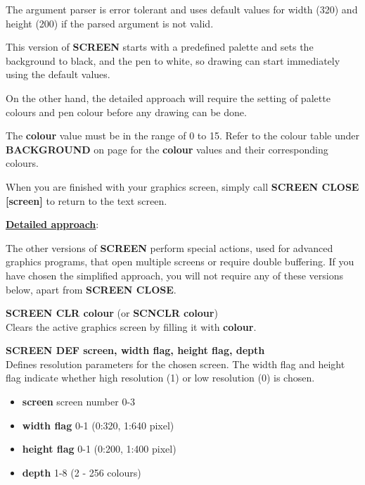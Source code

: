 \begin{description}[leftmargin=2cm,style=nextline]
               The argument parser is error tolerant and uses default values
               for width (320) and height (200)
               if the parsed argument is not valid.

               This version of {\bf SCREEN} starts with a predefined
               palette and sets the background to black, and the pen to white,
               so drawing can start immediately using the default values.

               On the other hand, the detailed approach
               will require the setting of palette colours and pen colour
               before any drawing can be done.

               The {\bf colour} value must be in the range of 0 to 15.
               Refer to the colour table under {\bf BACKGROUND} on page
               \pageref{colourtable} for the {\bf colour} values and their corresponding colours.

               When you are finished with your graphics screen, simply call
               {\bf SCREEN CLOSE [screen]} to return to the text screen.

        \underline{{\bf Detailed approach}}:

               The other versions of
               {\bf SCREEN} perform special actions, used for
               advanced graphics programs, that open multiple screens
               or require double buffering. If you have chosen the simplified
               approach, you will not require any of these versions below,
               apart from {\bf SCREEN CLOSE}.

                {\bf SCREEN CLR colour} (or {\bf SCNCLR colour}) \\
                Clears the active graphics screen by filling it with {\bf colour}.

                {\bf SCREEN DEF screen, width flag, height flag, depth} \\
                Defines resolution parameters for the chosen
                screen. The width flag and height flag indicate
                whether high resolution (1) or low resolution (0) is chosen.

                \begin{itemize}
                  \item {\bf screen} screen number 0-3
                  \item {\bf width flag} 0-1 (0:320, 1:640 pixel)
                  \item {\bf height flag} 0-1 (0:200, 1:400 pixel)
                  \item {\bf depth} 1-8 (2 - 256 colours)
                \end{itemize}


\end{description}
